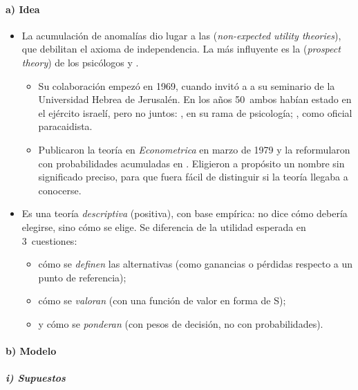 \documentclass[11pt]{article}
\begin{document}
\paragraph{a) Idea}

\begin{itemize}
\item La acumulación de anomalías dio lugar a las  (\emph{non-expected utility theories}), que debilitan el axioma de independencia. La más influyente es la  (\emph{prospect theory}) de los psicólogos  y .
  \begin{itemize}
  \item Su colaboración empezó en 1969, cuando  invitó a  a su seminario de la Universidad Hebrea de Jerusalén. En los años 50~ambos habían estado en el ejército israelí, pero no juntos: , en su rama de psicología; , como oficial paracaidista\nocite{Kahneman2002Biografia}.
  \item Publicaron la teoría en \emph{Econometrica} en marzo de 1979\nocite{KahnemanTversky1979Prospect} y la reformularon con probabilidades acumuladas en \textcite{TverskyKahneman1992Advances}. Eligieron a propósito un nombre sin significado preciso, para que fuera fácil de distinguir si la teoría llegaba a conocerse\nocite{Kahneman2002Biografia}.
  \end{itemize}
\item Es una teoría \emph{descriptiva} (positiva), con base empírica: no dice cómo debería elegirse, sino cómo se elige. Se diferencia de la utilidad esperada en 3~cuestiones:
  \begin{itemize}
  \item cómo se \emph{definen} las alternativas (como ganancias o pérdidas respecto a un punto de referencia);
  \item cómo se \emph{valoran} (con una función de valor en forma de S);
  \item y cómo se \emph{ponderan} (con pesos de decisión, no con probabilidades).
  \end{itemize}
\end{itemize}

\paragraph{b) Modelo}

\subparagraph{i) Supuestos}
\end{document}
